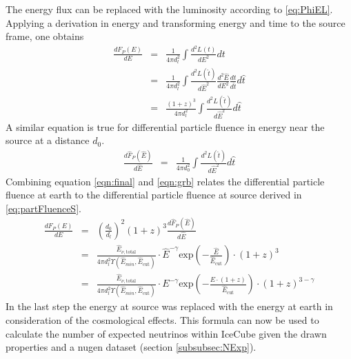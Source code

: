 The energy flux can be replaced with the luminosity according to
\ref{eq:PhiEL}. Applying a derivation in energy and transforming energy and
time to the source frame, one obtains
\begin{eqnarray}
  \frac {dF_P(E)}{dE}
     & = &  \frac{1}{4 \pi d_l^2} \int \frac{d^2 L(t)}{dE^2} dt \\
     & = &  \frac{1}{4 \pi d_l^2} \int \frac{d^2 L(\hat{t})}{d\hat{E}^2}
     \frac{d^2\hat{E}}{dE^2} \frac{dt}{d\hat{t}}
     d\hat{t} \\
     & = & \frac{(1+z)^3} {4 \pi d_l^2} \int \frac{d^2 L(\hat{t})}{d\hat{E}^2}
     d\hat{t}
     \label{eqn:final}
\end{eqnarray}
A similar equation is true for differential particle fluence in energy near the
source at a distance $d_0$.
\begin{eqnarray}
\frac {d\hat{F}_P(\hat{E})}{d\hat{E}}
  & = & \frac{1}{4 \pi d_0^2} \int \frac{d^2 L(\hat{t})}{d\hat{E}^2} d\hat{t}
  \label{eqn:grb}
\end{eqnarray}
Combining equation \ref{eqn:final} and \ref{eqn:grb} relates the differential
particle fluence at earth to the differential particle fluence at source
derived in \ref{eq:partFluenceS}.
\begin{eqnarray}
  \frac{dF_P(E)}{dE}
    & = & \left(\frac{d_0}{d_l}\right)^2 (1+z)^3 \frac
{d\hat{F}_P(\hat{E})}{d\hat{E}} \\
&=& \frac{\hat{E}_{\nu, \text{total}}}{4 \pi
d_l^2\Upsilon\left(\hat{E}_{min}, \hat{E}_\text{cut}\right)} \cdot
\hat{E}^{-\gamma}
\text{exp} \left( - \frac{\hat{E}}{\hat{E}_\text{cut}} \right) \cdot (1+z)^3 \\
&=& \frac{\hat{E}_{\nu, \text{total}}}{4 \pi
d_l^2\Upsilon\left(\hat{E}_{min}, \hat{E}_\text{cut}\right)} \cdot
E^{-\gamma}
\text{exp} \left( - \frac{E \cdot (1+z)}{\hat{E}_\text{cut}} \right) \cdot
(1+z)^{3 - \gamma}
\end{eqnarray}
In the last step the energy at source was replaced with the energy at earth in
consideration of the cosmological effects. This formula can now be used to
calculate the number of expected neutrinos within IceCube given the drawn
properties and a nugen dataset (section \ref{subsubsec:NExp}).

